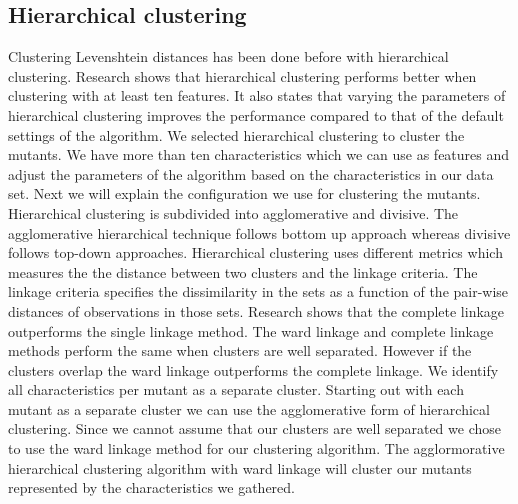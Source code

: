 \documentclass[../../main]{subfiles}
\begin{document}
\subsection{Hierarchical clustering}
Clustering Levenshtein distances has been done before with hierarchical clustering\cite{Rajalingam2011, Gothai2010PerformanceAlgorithms}. 
Research shows that hierarchical clustering performs better when clustering with at least ten features\cite{Rodriguez2019}.
It also states that varying the parameters of hierarchical clustering improves the performance compared to that of the default settings of the algorithm\cite{Rodriguez2019}.
We selected hierarchical clustering to cluster the mutants.
We have more than ten characteristics which we can use as features and adjust the parameters of the algorithm based on the characteristics in our data set.
Next we will explain the configuration we use for clustering the mutants. 
\newline
Hierarchical clustering is subdivided into agglomerative and divisive. 
The agglomerative hierarchical technique follows bottom up approach whereas divisive follows top-down approaches.
Hierarchical clustering uses different metrics which measures the the distance between two clusters and the linkage criteria\cite{Rajalingam2011}. 
The linkage criteria specifies the dissimilarity in the sets as a function of the pair-wise distances of observations in those sets\cite{Rajalingam2011}.
\newline
Research shows that the complete linkage outperforms the single linkage method\cite{Vijaya2019ComparativeClustering}.
The ward linkage and complete linkage methods perform the same when clusters are well separated\cite{Vijaya2019ComparativeClustering}.
However if the clusters overlap the ward linkage outperforms the complete linkage\cite{Vijaya2019ComparativeClustering}.
\newline
We identify all characteristics per mutant as a separate cluster.
Starting out with each mutant as a separate cluster we can use the agglomerative form of hierarchical clustering.
Since we cannot assume that our clusters are well separated we chose to use the ward linkage method for our clustering algorithm.
The agglormorative hierarchical clustering algorithm with ward linkage will cluster our mutants represented by the characteristics we gathered.
\end{document}
